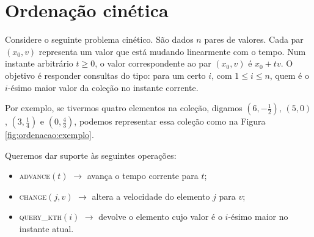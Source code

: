 
\chapter{Ordenação cinética}
Considere o seguinte problema cinético. São dados $n$ pares de
valores. Cada par $(x_0, v)$ representa um valor que está mudando
linearmente com o tempo. Num instante arbitrário $t \geq 0$, o valor
correspondente ao par $(x_0, v)$ é $x_0 + tv$. O objetivo é
responder consultas do tipo: para um certo $i$, com $1 \leq i \leq
n$, quem é o $i$-ésimo maior valor da coleção no instante corrente.

Por exemplo, se tivermos quatro elementos na coleção, digamos
$\left(6, -\frac{1}{2}\right)$, $(5, 0)$, $\left(3,
\frac{1}{4}\right)$ e $\left(0, \frac{4}{3}\right)$, podemos
representar essa coleção como na Figura \ref{fig:ordenacao:exemplo}.



\newpage

Queremos dar suporte às seguintes operações:
\begin{itemize}
    \item \textsc{advance}$(t)$ $\rightarrow$ avança o tempo
    corrente para $t$;
    \item \textsc{change}$(j, v)$ $\rightarrow$ altera a
    velocidade do elemento $j$ para $v$;
    \item \textsc{query\_kth}$(i)$ $\rightarrow$ devolve o
    elemento cujo valor é o $i$-ésimo maior no instante atual.
\end{itemize}


